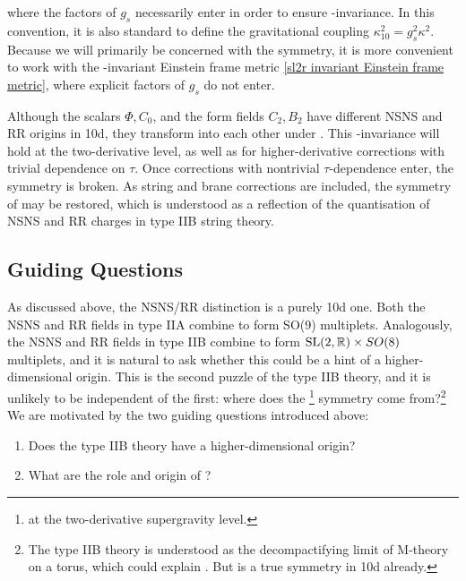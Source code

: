 where the factors of $g_s$ necessarily enter in order to ensure \SLR{}-invariance.
In this convention, it is also standard to define the gravitational coupling $\kappa_{10}^2 = g_s^2 \kappa^2$.
Because we will primarily be concerned with the \SLR{} symmetry, it is more convenient to work with the \SLR{}-invariant Einstein frame metric \eqref{sl2r invariant Einstein frame metric}, where explicit factors of $g_s$ do not enter.

Although the scalars $\Phi, C_0$, and the form fields $C_2, B_2$ have different NSNS and RR origins in 10d, they transform into each other under \SLR{}.
This \SLR{}-invariance will hold at the two-derivative level, as well as for higher-derivative corrections with trivial dependence on $\tau$.
Once corrections with nontrivial $\tau$-dependence enter, the \SLR{} symmetry is broken.
As string and brane corrections are included, the symmetry of \SLZ{} may be restored, which is understood as a reflection of the quantisation of NSNS and RR charges in type IIB string theory.

\subsection{Guiding Questions}

As discussed above, the NSNS/RR distinction is a purely 10d one.
Both the NSNS and RR fields in type IIA combine to form SO(9) multiplets.
Analogously, the NSNS and RR fields in type IIB combine to form $\mathrm{SL}(2,\mathbb{R}){}\times SO(8)$ multiplets, and it is natural to ask whether this could be a hint of a higher-dimensional origin.
This is the second puzzle of the type IIB theory, and it is unlikely to be independent of the first: where does the \SLZ{}\footnote{
\SLR{} at the two-derivative supergravity level.
} symmetry come from?\footnote{
The type IIB theory is understood as the decompactifying limit of M-theory on a torus, which could explain \SLZ{}. But \SLZ{} is a true symmetry in 10d already.}
We are motivated by the two guiding questions introduced above:
\begin{enumerate}
    \item Does the type IIB theory have a higher-dimensional origin?
    \item What are the role and origin of \SLZ{}?
\end{enumerate}